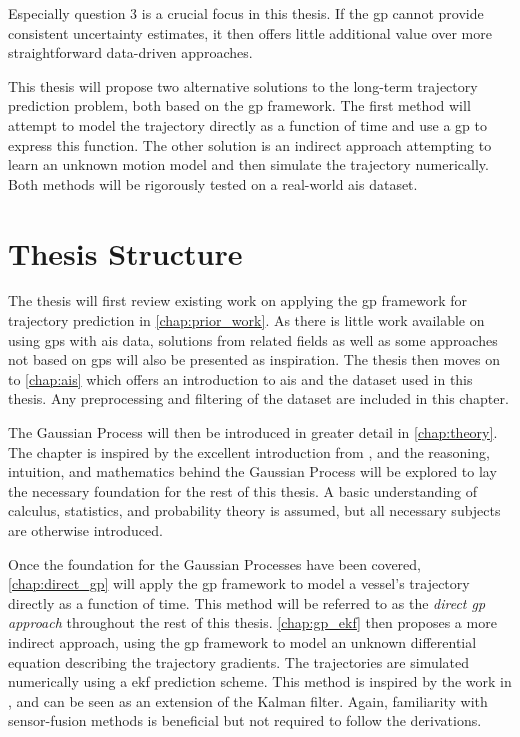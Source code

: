 Especially question 3 is a crucial focus in this thesis. If the \acrshort{gp} cannot provide consistent uncertainty estimates, it then offers little additional value over more straightforward data-driven approaches. 


This thesis will propose two alternative solutions to the long-term trajectory prediction problem, both based on the \acrshort{gp} framework. The first method will attempt to model the trajectory directly as a function of time and use a \acrshort{gp} to express this function. The other solution is an indirect approach attempting to learn an unknown motion model and then simulate the trajectory numerically. Both methods will be rigorously tested on a real-world \acrshort{ais} dataset.

\section{Thesis Structure}
The thesis will first review existing work on applying the \acrshort{gp} framework for trajectory prediction in \cref{chap:prior_work}. As there is little work available on using \acrshort{gp}s with \acrshort{ais} data, solutions from related fields as well as some approaches not based on \acrshort{gp}s will also be presented as inspiration. The thesis then moves on to \cref{chap:ais} which offers an introduction to \acrshort{ais} and the dataset used in this thesis. Any preprocessing and filtering of the dataset are included in this chapter.

The Gaussian Process will then be introduced in greater detail in \cref{chap:theory}. The chapter is inspired by the excellent introduction from \cite{rasmussen}, and the reasoning, intuition, and mathematics behind the Gaussian Process will be explored to lay the necessary foundation for the rest of this thesis. A basic understanding of calculus, statistics, and probability theory is assumed, but all necessary subjects are otherwise introduced.  

Once the foundation for the Gaussian Processes have been covered, \cref{chap:direct_gp} will apply the \acrshort{gp} framework to model a vessel's trajectory directly as a function of time. This method will be referred to as the \textit{direct \acrshort{gp} approach} throughout the rest of this thesis.
\cref{chap:gp_ekf} then proposes a more indirect approach, using the \acrshort{gp} framework to model an unknown differential equation describing the trajectory gradients. The trajectories are simulated numerically using a \acrshort{ekf} prediction scheme. This method is inspired by the work in \cite{pedestrian,gpekf}, and can be seen as an extension of the Kalman filter. Again, familiarity with sensor-fusion methods is beneficial but not required to follow the derivations.

